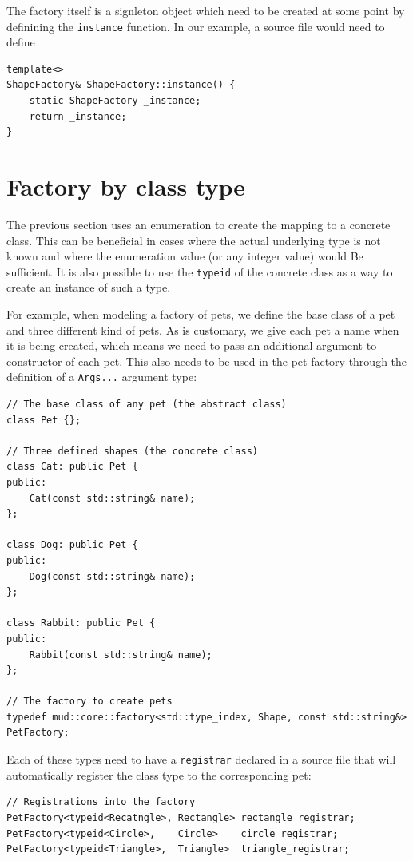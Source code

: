 \documentclass[10pt,a4paper,openany]{mudbook}
\makeatletter
\newcommand{\indextt}[2][]{\texttt{#2}\index{#2@\texttt{#2}#1}}
\makeatother
\begin{document}
The factory itself is a signleton object which need to be created at some point
by definining the \texttt{instance} function. In our example, a \Cpp source file
would need to define

\begin{lstlisting}[style=snippet]
template<>
ShapeFactory& ShapeFactory::instance() {
    static ShapeFactory _instance;
    return _instance;
}
\end{lstlisting}

\section{Factory by class type}
\label{sct:factory-class}

The previous section uses an enumeration to create the mapping to a concrete
class. This can be beneficial in cases where the actual underlying type is
not known and where the enumeration value (or any integer value) would Be
sufficient. It is also possible to use the \indextt{typeid} of the concrete
class as a way to create an instance of such a type.

For example, when modeling a factory of pets, we define the base class of
a pet and three different kind of pets. As is customary, we give each pet
a name when it is being created, which means we need to pass an additional
argument to constructor of each pet. This also needs to be used in the
pet factory through the definition of a \texttt{Args...} argument type:

\begin{lstlisting}[style=snippet]
// The base class of any pet (the abstract class)
class Pet {};
  
// Three defined shapes (the concrete class)
class Cat: public Pet {
public:
    Cat(const std::string& name);
};

class Dog: public Pet {
public:
    Dog(const std::string& name);
};

class Rabbit: public Pet {
public:
    Rabbit(const std::string& name);
};
  
// The factory to create pets
typedef mud::core::factory<std::type_index, Shape, const std::string&> PetFactory;
\end{lstlisting}

Each of these types need to have a \texttt{registrar} declared in a \Cpp
source file that will automatically register the class type to the
corresponding pet:

\begin{lstlisting}[style=snippet]
// Registrations into the factory
PetFactory<typeid<Recatngle>, Rectangle> rectangle_registrar;
PetFactory<typeid<Circle>,    Circle>    circle_registrar;
PetFactory<typeid<Triangle>,  Triangle>  triangle_registrar;
\end{lstlisting}
\end{document}
